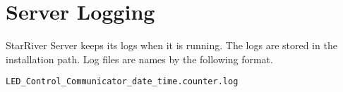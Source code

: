 \section{Server Logging}\label{server-logging}

StarRiver Server keeps its logs when it is running. The logs are stored
in the installation path. Log files are names by the following format.

\begin{verbatim}
LED_Control_Communicator_date_time.counter.log
\end{verbatim}
